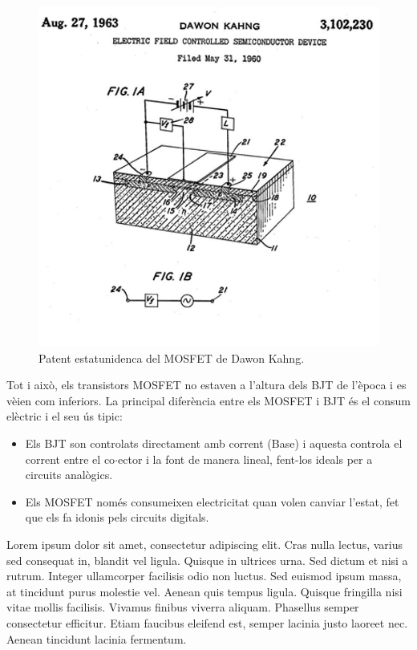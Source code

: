 \documentclass[11pt,a4paper]{article}
\begin{document}
\begin{figure}
    \centering
    \includegraphics[width=\linewidth]{images/patent kahang.jpg}
    \caption{Patent estatunidenca del MOSFET de Dawon Kahng.}
\end{figure}

Tot i això, els transistors MOSFET no estaven a l'altura dels BJT de l'època i es vèien com inferiors. La principal diferència entre els MOSFET i BJT és el consum elèctric i el seu ús tipic: 
\begin{itemize}
    \item Els BJT son controlats directament amb corrent (Base) i aquesta controla el corrent entre el co$\cdot$ector i la font de manera lineal, fent-los ideals per a circuits analògics.
    \item Els MOSFET només consumeixen electricitat quan volen canviar l'estat, fet que els fa idonis pels circuits digitals.
\end{itemize}



Lorem ipsum dolor sit amet, consectetur adipiscing elit. Cras nulla lectus, varius sed consequat in, blandit vel ligula. Quisque in ultrices urna. Sed dictum et nisi a rutrum. Integer ullamcorper facilisis odio non luctus. Sed euismod ipsum massa, at tincidunt purus molestie vel. Aenean quis tempus ligula. Quisque fringilla nisi vitae mollis facilisis. Vivamus finibus viverra aliquam. Phasellus semper consectetur efficitur. Etiam faucibus eleifend est, semper lacinia justo laoreet nec. Aenean tincidunt lacinia fermentum.
\end{document}
